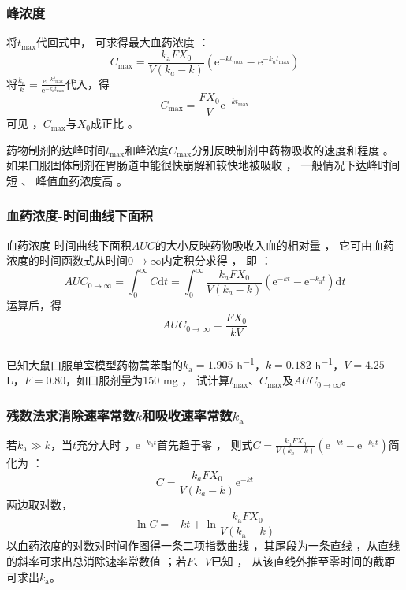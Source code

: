 \documentclass[dvipsnames, svgnames, x11names]{beamer}
\begin{document}
\begin{frame}
    \frametitle{峰浓度}
    将$t_\mathrm{max}$代回式中， 可求得最大血药浓度 ：
    \[
        C_{\mathrm{max}}=\frac{k_{\mathrm{a}}FX_{0}}{V(k_{{a}}-k)}(\mathrm{e}^{-kt_{{max}}}-\mathrm{e}^{-k_{{a}}t_{{\mathrm{max}}}})
    \]
    将$\frac{k_\mathrm{a}}k=\frac{\mathrm{e}^{-kt_\mathrm{max}}}{\mathrm{e}^{-k_\mathrm{a}t_\mathrm{max}}}$代入，得
    \[
        C_{\mathrm{max}}=\frac{FX_{0}}{V}\mathrm{e}^{-kt_{\mathrm{max}}}
    \]
    可见 ，$C_\mathrm{max}$与$X_{0}$成正比 。 
    \begin{blankblock}{}
        药物制剂的达峰时间$t_\mathrm{max}$和峰浓度$C_\mathrm{max}$分别反映制剂中药物吸收的速度和程度 。 如果口服固体制剂在胃肠道中能很快崩解和较快地被吸收 ， 一般情况下达峰时间短 、 峰值血药浓度高 。
    \end{blankblock}
    
\end{frame}


\begin{frame}
    \frametitle{血药浓度-时间曲线下面积}
    血药浓度-时间曲线下面积$AUC$的大小反映药物吸收入血的相对量 ， 它可由血药浓度的时间函数式从时间$0\to \infty$内定积分求得 ， 即 ：
    \[
        AUC_{0\to\infty}=\int_0^\infty C\mathrm{d}t=\int_0^\infty\frac{k_aFX_0}{V(k_a-k)}(\mathrm{e}^{-kt}-\mathrm{e}^{-k_\mathrm{a}t})\mathrm{d}t
    \]
    运算后，得
    \[
        AUC_{0\to\infty}=\frac{FX_{0}}{kV}
    \]
\end{frame}


\begin{frame}[t]
    \frametitle{}
    \begin{example}
        已知大鼠口服单室模型药物蒿苯酯的$k_\mathrm{a}=1.905$ \si{h^{-1}}，$k=0.182$ \si{h^{-1}}，$V=4.25$ \si{L}，$F=0.80$，如口服剂量为150 mg ， 试计算$t_\mathrm{max}$、$C_\mathrm{max}$及$AUC_{0\to\infty}$。
    \end{example}
\end{frame}


\begin{frame}
    \frametitle{残数法求消除速率常数$k$和吸收速率常数$k_\mathrm{a}$}
    若$k_\mathrm{a}\gg k$，当$t$充分大时 ，$\mathrm{e}^{-k_\mathrm{a}t}$首先趋于零 ， 则式$C=\frac{k_{a}FX_0}{V(k_{a}-k)}(\mathrm{e}^{-kt}-\mathrm{e}^{-k_\mathrm{a}t})$简化为 ：
    \[
        C=\frac{k_{a}FX_0}{V(k_{a}-k)}\mathrm{e}^{-kt}
    \]
    两边取对数，
    \[
        \ln C=-kt+\ln\frac{k_{\mathrm{a}}FX_{0}}{V(k_{\mathrm{a}}-k)}
    \]
    以血药浓度的对数对时间作图得一条二项指数曲线 ，其尾段为一条直线 ，从直线的斜率可求出总消除速率常数值 ；若$F$、$V$已知 ， 从该直线外推至零时间的截距可求出$k_{\mathrm{a}}$。
\end{frame}
\end{document}
